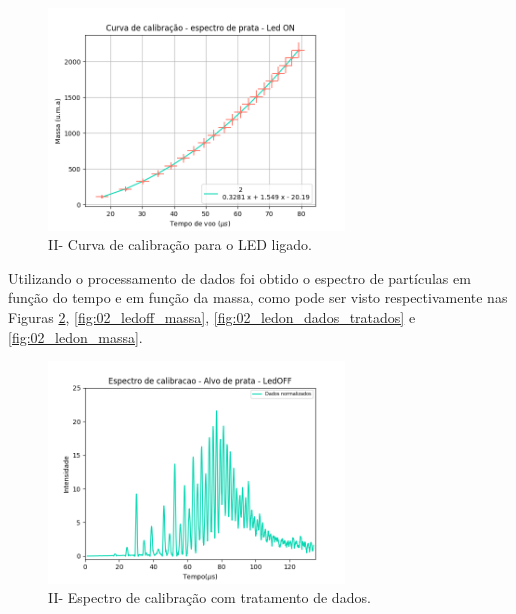 \begin{figure}
  \centering  
  \includegraphics[width=0.7\textwidth]{exp_02/LEDON_curv+erro_calib.png}
  \caption{II- Curva de calibração para o LED ligado.}
  \label{fig:02_calib_ledON} 
\end{figure}



Utilizando o processamento de dados foi obtido o espectro de partículas em função do tempo e em função da massa, como pode ser visto respectivamente nas Figuras \ref{fig:02_ledoff_dados_tratados}, \ref{fig:02_ledoff_massa}, \ref{fig:02_ledon_dados_tratados} e \ref{fig:02_ledon_massa}.

\begin{figure}
  \centering  
  \includegraphics[width=0.7\textwidth]{exp_02/LEDOFF_normalizado_mcp.png}
  \caption{II- Espectro de calibração com tratamento de dados.}
  \label{fig:02_ledoff_dados_tratados} 
\end{figure}

